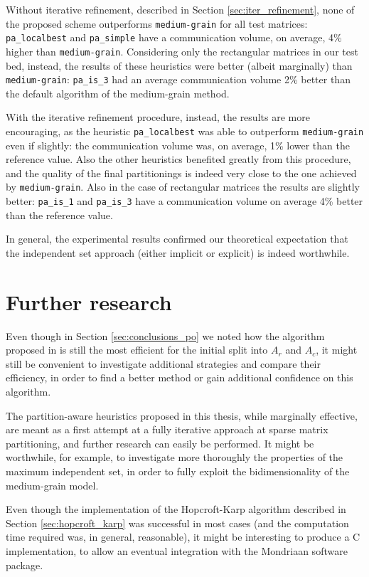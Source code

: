 Without iterative refinement, described in Section \ref{sec:iter_refinement}, none of the proposed scheme outperforms \verb|medium-grain| for all test matrices: \verb|pa_localbest| and \verb|pa_simple| have a communication volume, on average, 4\% higher than \verb|medium-grain|.  Considering only the rectangular matrices in our test bed, instead, the results of these heuristics were better (albeit marginally) than \verb|medium-grain|: \verb|pa_is_3| had an average communication volume 2\% better than the default algorithm of the medium-grain method.

With the iterative refinement procedure, instead, the results are more encouraging, as the heuristic \verb|pa_localbest| was able to outperform \verb|medium-grain| even if slightly: the communication volume was, on average, 1\% lower than the reference value. Also the other heuristics benefited greatly from this procedure, and the quality of the final partitionings is indeed very close to the one achieved by \verb|medium-grain|. Also in the case of rectangular matrices the results are slightly better: \verb|pa_is_1| and \verb|pa_is_3| have a communication volume on average 4\% better than the reference value.

In general, the experimental results confirmed our theoretical expectation that the independent set approach (either implicit or explicit) is indeed worthwhile.

\section{Further research}

Even though in Section \ref{sec:conclusions_po} we noted how the algorithm proposed in \cite{mediumgrain} is still the most efficient for the initial split into $A_r$ and $A_c$, it might still be convenient to investigate additional strategies and compare their efficiency, in order to find a better method or gain additional confidence on this algorithm.

The partition-aware heuristics proposed in this thesis, while marginally effective, are meant as a first attempt at a fully iterative approach at sparse matrix partitioning, and further research can easily be performed. It might be worthwhile, for example, to investigate more thoroughly the properties of the maximum independent set, in order to fully exploit the bidimensionality of the medium-grain model.

Even though the implementation of the Hopcroft-Karp algorithm described in Section \ref{sec:hopcroft_karp} was successful in most cases (and the computation time required was, in general, reasonable), it might be interesting to produce a C implementation, to allow an eventual integration with the Mondriaan software package. 

